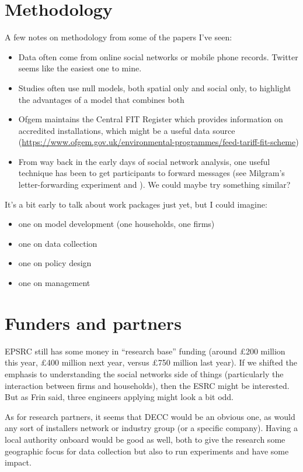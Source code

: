 \documentclass{jk-article}
\begin{document}
\section{Methodology}
A few notes on methodology from some of the papers I've seen:
\begin{itemize}
\item Data often come from online social networks or mobile phone records.  Twitter seems like the easiest one to mine.
\item Studies often use null models, both spatial only and social only, to highlight the advantages of a model that combines both \cite{Expert_Evans_Blondel_Lambiotte_2011, Scellato_Lambiotte_Mascolo_2010}
\item Ofgem maintains the Central FIT Register which provides information on accredited installations, which might be a useful data source (\url{https://www.ofgem.gov.uk/environmental-programmes/feed-tariff-fit-scheme})
\item From way back in the early days of social network analysis, one useful technique has been to get participants to forward messages (see Milgram's letter-forwarding experiment and \cite{Illenberger_Flotterod_Kowald_Nagel_2003}).  We could maybe try something similar?
\end{itemize}

It's a bit early to talk about work packages just yet, but I could imagine:
\begin{itemize}
\item one on model development (one households, one firms)
\item one on data collection
\item one on policy design
\item one on management
\end{itemize}

\section{Funders and partners}

EPSRC still has some money in ``research base'' funding (around £200 million this year, £400 million next year, versus £750 million last year).  If we shifted the emphasis to understanding the social networks side of things (particularly the interaction between firms and households), then the ESRC might be interested.  But as Frin said, three engineers applying might look a bit odd.

As for research partners, it seems that DECC would be an obvious one, as would any sort of installers network or industry group (or a specific company).  Having a local authority onboard would be good as well, both to give the research some geographic focus for data collection but also to run experiments and have some impact.



\end{document}
